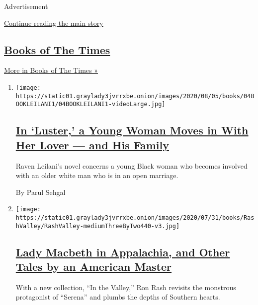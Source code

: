 Advertisement

\protect\hyperlink{after-mid1}{Continue reading the main story}

\hypertarget{books-of-the-times}{%
\subsection{\texorpdfstring{\href{/column/books-of-the-times}{Books of
The Times}}{Books of The Times}}\label{books-of-the-times}}

\href{/column/books-of-the-times}{More in Books of The Times »}

\begin{enumerate}
\def\labelenumi{\arabic{enumi}.}
\item
  \texttt{[image: https://static01.graylady3jvrrxbe.onion/images/2020/08/05/books/04BOOKLEILANI1/04BOOKLEILANI1-videoLarge.jpg]}

  \hypertarget{in-luster-a-young-woman-moves-in-with-her-lover--and-his-family}{%
  \subsection{\texorpdfstring{\href{/2020/08/04/books/review-luster-raven-leilani.html}{In
  `Luster,' a Young Woman Moves in With Her Lover --- and His
  Family}}{In `Luster,' a Young Woman Moves in With Her Lover --- and His Family}}\label{in-luster-a-young-woman-moves-in-with-her-lover--and-his-family}}

  Raven Leilani's novel concerns a young Black woman who becomes
  involved with an older white man who is in an open marriage.

  By Parul Sehgal
\item
  \texttt{[image: https://static01.graylady3jvrrxbe.onion/images/2020/07/31/books/RashValley/RashValley-mediumThreeByTwo440-v3.jpg]}

  \hypertarget{lady-macbeth-in-appalachia-and-other-tales-by-an-american-master}{%
  \subsection{\texorpdfstring{\href{/2020/08/02/books/ron-rash-in-valley-serena.html}{Lady
  Macbeth in Appalachia, and Other Tales by an American
  Master}}{Lady Macbeth in Appalachia, and Other Tales by an American Master}}\label{lady-macbeth-in-appalachia-and-other-tales-by-an-american-master}}

  With a new collection, ``In the Valley,'' Ron Rash revisits the
  monstrous protagonist of ``Serena'' and plumbs the depths of Southern
  hearts.


\end{enumerate}
